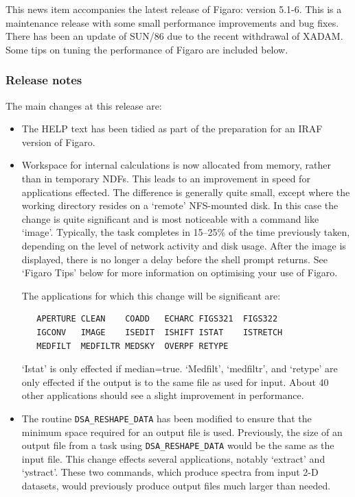 \documentclass[11pt,twoside]{article}
\newcommand{\htmlref}[2]{#1}
\newcommand{\latorhtm}[2]{#1}
\newcommand{\latorhtm}[2]{#2}
\begin{document}
 This news item accompanies the latest release of Figaro: version
 5.1-6.  This is a maintenance release with some small performance
 improvements and bug fixes.  There has been an update of SUN/86
 due to the recent withdrawal of XADAM.  Some tips on tuning the
 performance of Figaro are included below.

\subsubsection{\label{news516_release_notes}Release notes}

   The main changes at this release are:

\begin{itemize}

\item The HELP text has been tidied as part of the preparation for
      an IRAF version of Figaro.

\item Workspace for internal calculations is now allocated from memory,
      rather than in temporary NDFs.  This leads to an improvement in
      speed for applications effected.  The difference is generally
      quite small, except where the working directory resides on a
      `remote' NFS-mounted disk.  In this case the change is quite
      significant and is most noticeable with a command like `image'.
      Typically, the task completes in 15--25\% of the time previously
      taken, depending on the level of network activity and disk usage.
      After the image is displayed, there is no longer a delay before
      the shell prompt returns.  See \latorhtm{`Figaro Tips' below}
      {\htmlref{Figaro Tips}{news516_figaro_tips}}
      for more information on optimising your use of Figaro.

      The applications for which this change will be significant are:

\begin{verbatim}
   APERTURE CLEAN    COADD   ECHARC FIGS321  FIGS322
   IGCONV   IMAGE    ISEDIT  ISHIFT ISTAT    ISTRETCH
   MEDFILT  MEDFILTR MEDSKY  OVERPF RETYPE
\end{verbatim}

      `Istat' is only effected if median=true.  `Medfilt', `medfiltr', and
      `retype' are only effected if the output is to the same file as
      used for input.  About 40 other applications should see a slight
      improvement in performance.

\item The routine \verb+DSA_RESHAPE_DATA+ has been modified to ensure that
      the minimum space required for an output file is used.  Previously,
      the size of an output file from a task using \verb+DSA_RESHAPE_DATA+
      would be the same as the input file.  This change effects several
      applications, notably `extract' and `ystract'\@.  These two commands,
      which produce spectra from input 2-D datasets, would previously
      produce output files much larger than needed.


\end{itemize}
\end{document}
